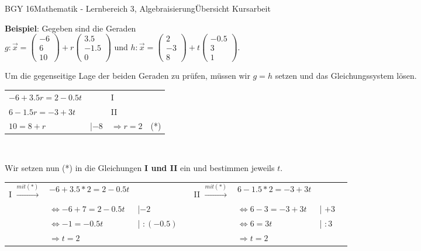 \documentclass[oneside,openany,headings=optiontotoc,11pt,numbers=noenddot]{scrreprt}
\begin{document}
\begin{worksheet}{BGY 16}{Mathematik - Lernbereich 3, Algebraisierung}{Übersicht Kursarbeit}
\begin{framed}
\begin{framed}
\begin{itemize}
				\end{itemize}
			\end{framed}
			\noindent
			\textbf{Beispiel}: Gegeben sind die Geraden\\ \(g: \vec{x} = \left(\begin{array}{c}-6\\6\\10\end{array}\right) + r\left(\begin{array}{c}3.5\\-1.5\\0\end{array}\right)\) und \(h: \vec{x} = \left(\begin{array}{c}2\\-3\\8\end{array}\right) + t\left(\begin{array}{c}-0.5\\3\\1\end{array}\right)\).\\
			\par\noindent
			Um die gegenseitige Lage der beiden Geraden zu prüfen, müssen wir \(g=h\) setzen und das Gleichungssystem lösen.\\
			\begin{tabularx}{\textwidth}{llll}
				\(-6 +3.5r = 2 -0.5t\) & & I\\
				\(6 -1.5r = -3 +3t\) & & II\\
				\(10 = 8 +r\) & |\(-8\) & \(\Rightarrow r= 2\) & (*)\\
			\end{tabularx}\\
			\par\noindent
			Wir setzen nun (*) in die Gleichungen \textbf{I und II} ein und bestimmen jeweils \(t\).\\
			\par\noindent
			\begin{tabularx}{\textwidth}{lXll|lXll}
				I \(\xrightarrow{mit (*)}\) & \( -6+3.5*2 = 2-0.5t\) & & & II \(\xrightarrow{mit (*)}\) & \(6 -1.5*2 = -3 +3t\)\\
				&\(\Leftrightarrow -6+7 = 2-0.5t\) & |\(-2\) & & & \(\Leftrightarrow 6-3 = -3 +3t\) & | \(+3\)\\
				&\(\Leftrightarrow -1 = -0.5t\) & | \(:(-0.5)\) & & & \(\Leftrightarrow 6 = 3t\) & | \(:3\)\\
				&\(\Rightarrow t = 2\) & & & & \(\Rightarrow t = 2\)\\				

\end{tabularx}
\end{framed}
\end{worksheet}
\end{document}

